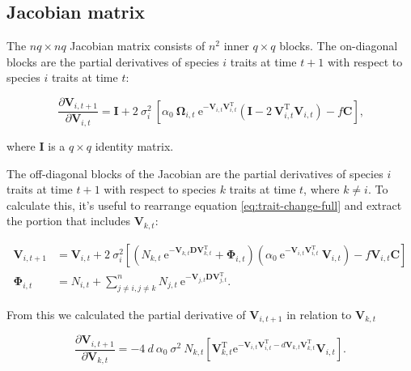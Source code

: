 \subsection*{Jacobian matrix}

The $nq \times nq$ Jacobian matrix consists of $n^2$ inner $q \times q$ blocks.
The on-diagonal blocks are the partial derivatives of species $i$ traits at time $t+1$ with respect
to species $i$ traits at time $t$:

$$
    \frac{ \partial \mathbf{V}_{i,t+1} }{ \partial \mathbf{V}_{i,t} } = \mathbf{I} + 2 ~ \sigma_i^2 ~
        \left[
            \alpha_0 ~ \mathbf{\Omega}_{i,t} ~ \textrm{e}^{ - \mathbf{V}_{i,t} \mathbf{V}_{i,t}^{\textrm{T}} }
            \left(
                \mathbf{I} - 2 ~ \mathbf{V}_{i,t}^{\textrm{T}} \mathbf{V}_{i,t}
            \right) -
            f \mathbf{C}
        \right]
    \textrm{,}
$$

\noindent where $\mathbf{I}$ is a $q \times q$ identity matrix.


The off-diagonal blocks of the Jacobian are the partial derivatives of species $i$
traits at time $t+1$ with respect to species $k$ traits at time $t$, where $k \ne i$.
To calculate this, it's useful to rearrange equation \ref{eq:trait-change-full} and
extract the portion that includes $\mathbf{V}_{k,t}$:

\begin{equation*}
\begin{split}
    \mathbf{V}_{i,t+1} &= \mathbf{V}_{i,t} + 2 ~ \sigma_i^2
    \left[
        \left(
            N_{k,t} ~ \textrm{e}^{-\mathbf{V}_{k,t} \mathbf{D} \mathbf{V}_{k,t}^\textrm{T}} +
            \mathbf{\Phi}_{i,t}
        \right)
        \left(
            \alpha_0 ~ \textrm{e}^{-\mathbf{V}_{i,t}
            \mathbf{V}_{i,t}^\textrm{T}} ~ \mathbf{V}_{i,t}
        \right)
        - f \mathbf{V}_{i,t} \mathbf{C}
    \right] \\
    \mathbf{\Phi}_{i,t} &= N_{i,t} + \sum_{j \ne i, j \ne k}^{n}{
        N_{j,t} ~ \textrm{e}^{- \mathbf{V}_{j,t} \mathbf{D}
        \mathbf{V}_{j,t}^{\textrm{T}}} }
    \textrm{.}
\end{split}
\end{equation*}

From this we calculated the partial derivative of $\mathbf{V}_{i,t+1}$ in relation to $\mathbf{V}_{k,t}$

$$
    \frac{ \partial\mathbf{V}_{i,t+1} }{ \partial\mathbf{V}_{k,t}} =
        -4 ~ d ~ \alpha_0 ~ \sigma^2 ~ N_{k,t}
        \left[
            \mathbf{V}_{k,t}^{\textrm{T}}
            \textrm{e}^{
                - \mathbf{V}_{i,t} \mathbf{V}_{i,t}^{\textrm{T}}
                - d \mathbf{V}_{k,t} \mathbf{V}_{k,t}^{\textrm{T}}
            }
            \mathbf{V}_{i,t}
        \right]
    \textrm{.}
$$


